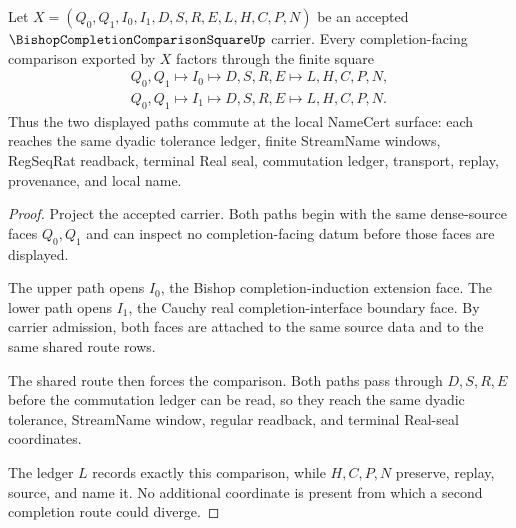 \begin{theorem}
\label{thm:bishop-completion-comparison-square-commutes}
Let $X=(Q_0,Q_1,I_0,I_1,D,S,R,E,L,H,C,P,N)$ be an accepted $\BishopCompletionComparisonSquareUp$ carrier. Every completion-facing comparison exported by $X$ factors through the finite square
$$
\begin{gathered}
Q_0,Q_1 \longmapsto I_0 \longmapsto D,S,R,E \longmapsto L,H,C,P,N,\\
Q_0,Q_1 \longmapsto I_1 \longmapsto D,S,R,E \longmapsto L,H,C,P,N .
\end{gathered}
$$
Thus the two displayed paths commute at the local NameCert surface: each reaches the same dyadic tolerance ledger, finite StreamName windows, RegSeqRat readback, terminal Real seal, commutation ledger, transport, replay, provenance, and local name.
\end{theorem}
\begin{proof}
Project the accepted carrier. Both paths begin with the same dense-source faces $Q_0,Q_1$ and can inspect no completion-facing datum before those faces are displayed.

The upper path opens $I_0$, the Bishop completion-induction extension face. The lower path opens $I_1$, the Cauchy real completion-interface boundary face. By carrier admission, both faces are attached to the same source data and to the same shared route rows.

The shared route then forces the comparison. Both paths pass through $D,S,R,E$ before the commutation ledger can be read, so they reach the same dyadic tolerance, StreamName window, regular readback, and terminal Real-seal coordinates.

The ledger $L$ records exactly this comparison, while $H,C,P,N$ preserve, replay, source, and name it. No additional coordinate is present from which a second completion route could diverge.
\end{proof}

